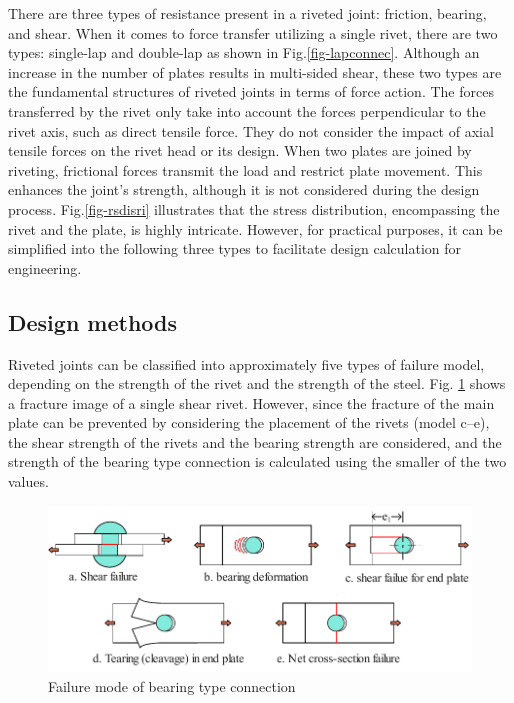 There are three types of resistance present in a riveted joint: friction, bearing, and shear. When it comes to force transfer utilizing a single rivet, there are two types: single-lap and double-lap as shown in Fig.\ref{fig-lapconnec}. Although an increase in the number of plates results in multi-sided shear, these two types are the fundamental structures of riveted joints in terms of force action. The forces transferred by the rivet only take into account the forces perpendicular to the rivet axis, such as direct tensile force. They do not consider the impact of axial tensile forces on the rivet head or its design. When two plates are joined by riveting, frictional forces transmit the load and restrict plate movement. This enhances the joint's strength, although it is not considered during the design process. Fig.\ref{fig-rsdisri} illustrates that the stress distribution, encompassing the rivet and the plate, is highly intricate. However, for practical purposes, it can be simplified into the following three types to facilitate design calculation for engineering.

\subsection{Design methods}

Riveted joints can be classified into approximately five types of failure model, depending on the strength of the rivet and the strength of the steel. Fig. \ref{fig-beafalmode} shows a fracture image of a single shear rivet. However, since the fracture of the main plate can be prevented by considering the placement of the rivets (model c--e), the shear strength of the rivets and the bearing strength are considered, and the strength of the bearing type connection is calculated using the smaller of the two values. 

\begin{figure}[htbp]
    \centering
    \includegraphics{imgs/ch2/failure-mode-bea.pdf}
    \caption{Failure mode of bearing type connection}
    \label{fig-beafalmode}
\end{figure}

